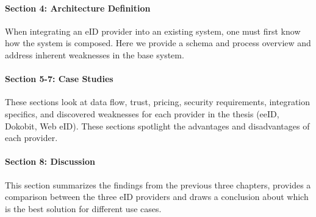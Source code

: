 \paragraph{Section 4: Architecture Definition} When integrating an eID provider into an existing system, one must first know how the system is composed. Here we provide a schema and process overview and address inherent weaknesses in the base system.
\paragraph{Section 5-7: Case Studies} These sections look at data flow, trust, pricing, security requirements, integration specifics, and discovered weaknesses for each provider in the thesis (eeID, Dokobit, Web eID). These sections spotlight the advantages and disadvantages of each provider.
\paragraph{Section 8: Discussion} This section summarizes the findings from the previous three chapters, provides a comparison between the three eID providers and draws a conclusion about which is the best solution for different use cases.